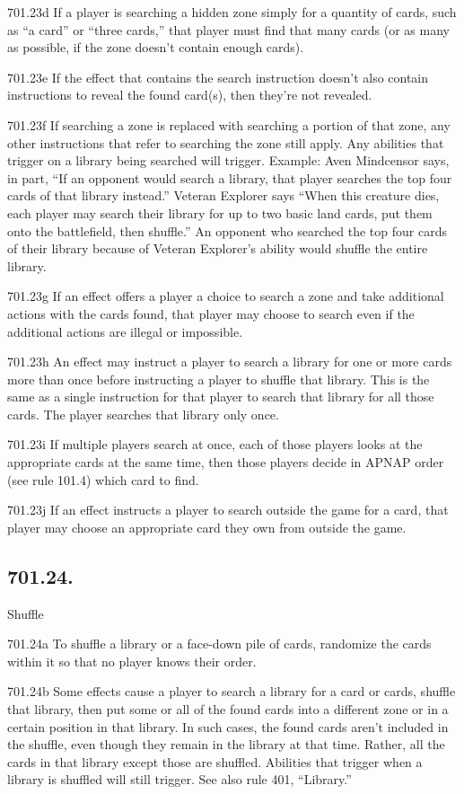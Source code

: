 701.23d If a player is searching a hidden zone simply for a quantity of cards, such as “a card” or “three cards,” that player must find that many cards (or as many as possible, if the zone doesn’t contain enough cards).

701.23e If the effect that contains the search instruction doesn’t also contain instructions to reveal the found card(s), then they’re not revealed.

701.23f If searching a zone is replaced with searching a portion of that zone, any other instructions that refer to searching the zone still apply. Any abilities that trigger on a library being searched will trigger.
Example: Aven Mindcensor says, in part, “If an opponent would search a library, that player searches the top four cards of that library instead.” Veteran Explorer says “When this creature dies, each player may search their library for up to two basic land cards, put them onto the battlefield, then shuffle.” An opponent who searched the top four cards of their library because of Veteran Explorer’s ability would shuffle the entire library.

701.23g If an effect offers a player a choice to search a zone and take additional actions with the cards found, that player may choose to search even if the additional actions are illegal or impossible.

701.23h An effect may instruct a player to search a library for one or more cards more than once before instructing a player to shuffle that library. This is the same as a single instruction for that player to search that library for all those cards. The player searches that library only once.

701.23i If multiple players search at once, each of those players looks at the appropriate cards at the same time, then those players decide in APNAP order (see rule 101.4) which card to find.

701.23j If an effect instructs a player to search outside the game for a card, that player may choose an appropriate card they own from outside the game.

\subsection*{701.24.}
Shuffle

701.24a To shuffle a library or a face-down pile of cards, randomize the cards within it so that no player knows their order.

701.24b Some effects cause a player to search a library for a card or cards, shuffle that library, then put some or all of the found cards into a different zone or in a certain position in that library. In such cases, the found cards aren’t included in the shuffle, even though they remain in the library at that time. Rather, all the cards in that library except those are shuffled. Abilities that trigger when a library is shuffled will still trigger. See also rule 401, “Library.”

